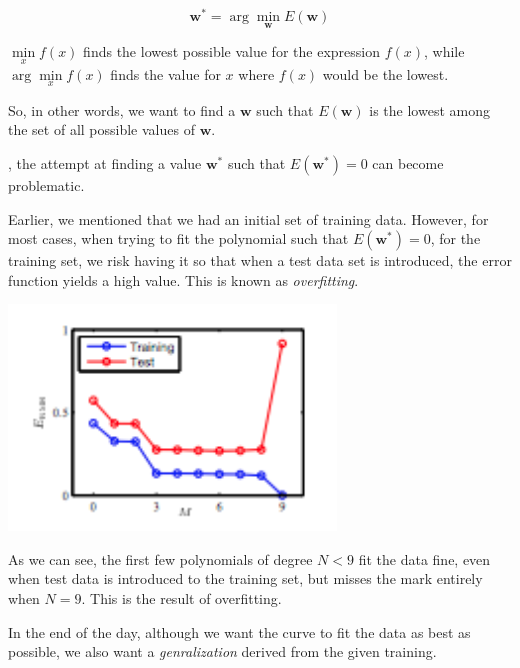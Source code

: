 \documentclass{tufte-handout}
\begin{document}
\begin{equation}
  \mathbf{w}^* = \arg \min\limits_{\mathbf{w}}E(\mathbf{w})
\end{equation}

$\min\limits_{x} f(x)$ finds the lowest possible value for the
expression $f(x)$, while $\arg\min\limits_{x} f(x)$ finds the value for $x$
where $f(x)$ would be the lowest.

So, in other words, we want to find a $\mathbf{w}$ such that $E(\mathbf{w})$ is
the lowest among the set of all possible values of $\mathbf{w}$.

, the attempt at finding a value $\mathbf{w}^*$ such that
$E(\mathbf{w}^*) = 0$ can become problematic.

Earlier, we mentioned that we had an initial set of training data. However, for
most cases, when trying to fit the polynomial such that $E(\mathbf{w}^*) = 0$,
for the training set, we risk having it so that when a test data set is
introduced, the error function yields a high value. This is known as
\textit{overfitting}.

\begin{marginfigure}
  \includegraphics[width=\linewidth]{overfitting.png}
  \caption{As we can see, the first few polynomials of degree $N < 9$ fit the
    data fine, even when test data is introduced to the training set, but misses
    the mark entirely when $N = 9$. This is the result of overfitting.}
\end{marginfigure}

In the end of the day, although we want the curve to fit the data as best as
possible, we also want a \textit{genralization} derived from the given training.
\end{document}
